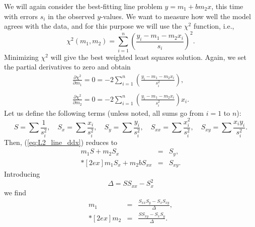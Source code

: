 We will again consider the best-fitting line problem $y = m_1 + bm_2 x$, this time with errors $s_i$ in the observed $y$-values.  We 
want to measure how well the model agrees with the data, and for this purpose we will use the $\chi^2$ 
function, i.e.,
\begin{equation}
\chi^2(m_1,m_2) = \sum^n_{i=1} \left ( \frac{y_i - m_1 - m_2 x_i}{s_i} \right ) ^2.
\label{eq:L2_line_chi2}
\end{equation}
Minimizing $\chi^2$  will give the best weighted least squares solution.  Again, we set the partial 
derivatives to zero and obtain
\begin{equation}
\begin{array}{c}
\displaystyle \frac{\partial \chi^2}{\partial m_1} = 0 = -2 \sum^n_{i=1} \left( \frac{y_i - m_1 -m_2 x_i}{s^2_i}\right),  \\
\ \\
\displaystyle \frac{\partial \chi^2}{\partial m_2} = 0 = -2 \sum^n_{i=1} \left( \frac{y_i - m_1 -m_2 x_i}{s^2_i}\right) x_i.
\end{array}
\label{eq:L2_line_ddx}
\end{equation}
Let us define the following terms (unless noted, all sums go from $i = 1$ to $n$):
\begin{equation}
S = \sum \frac{1}{s^2_i}, \quad S_x = \sum \frac{x_i}{s^2_i}, \quad S_y = 
\sum \frac{y_i}{s^2_i}, \quad S_{xx} = \sum \frac{x^2_i}{s^2_i}, \quad
S_{xy} = \sum \frac{x_i y_i}{s^2_i}.
\end{equation}
Then, (\ref{eq:L2_line_ddx}) reduces to
\begin{equation}
\begin{array}{rcl}
\displaystyle
m_1 S  + m_2 S_x & = & S_y, \\*[2ex]
m_1 S_x + m_2 bS_{xx} & = & S_{xy}.
\end{array}
\end{equation} 	 
Introducing 
\begin{equation}
\Delta = SS_{xx} - S ^2 _x
\end{equation}
we find
\begin{equation}
\begin{array}{rcl}
m_1 & = & \displaystyle \frac{S_{xx}S_y - S_x S_{xy}}{\Delta},\\*[2ex]
m_2 & = & \displaystyle \frac{S S_{xy}- S_x S_{y}}{\Delta}.
\end{array}
\label{eq:L2_sol_ab}
\end{equation}
